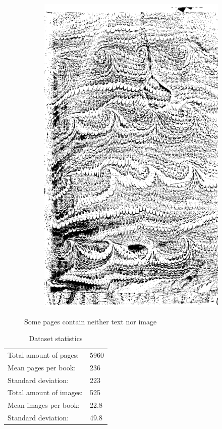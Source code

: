 \begin{figure}
\begin{subfigure}[b]{0.4\textwidth}
\includegraphics[width=\textwidth]{resources/500_0004}
    \end{subfigure}
    \caption{Some pages contain neither text nor image}
    \label{fig:baggerExamples}
\end{figure}


\begin{table}
\centering
\begin{tabular}{l l}
Total amount of pages: & 5960 \\
Mean pages per book: & 236 \\
Standard deviation: & 223 \\
\hline
Total amount of images: & 525 \\
Mean images per book: & 22.8 \\
Standard deviation: & 49.8
\end{tabular}
\caption{Dataset statistics}
\label{tab:statistics}
\end{table}

